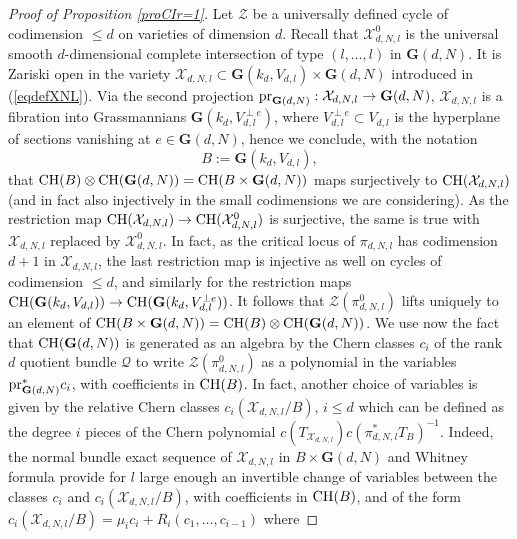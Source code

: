 \documentclass[10pt]{article}
\begin{document}
 \begin{proof}[Proof of Proposition \ref{proCIr=1}] Let $\mathcal{Z}$ be  a universally defined cycle
  of codimension $\leq d$  on varieties of dimension $d$.
Recall that $\mathcal{X}_{d,N,l}^0$ is the universal smooth $d$-dimensional complete intersection of type $(l,\ldots,l)$ in $\mathbf{G}(d,N) $. It is Zariski open in
 the variety $\mathcal{X}_{d,N,l}\subset \mathbf{G}(k_{d}, V_{d,l})\times \mathbf{G}(d,N) $ introduced in (\ref{eqdefXNL}). Via the second projection
 ${\rm pr}_{\mathbf{G}(d,N)}:\mathcal{X}_{d,N,l}\rightarrow \mathbf{G}(d,N)$, $\mathcal{X}_{d,N,l}$ is
 a fibration into Grassmannians $\mathbf{G}(k_{d}, V_{d,l}^{\perp e})$, where
 $V_{d,l}^{\perp e}\subset V_{d,l}$ is the hyperplane of sections vanishing at $e\in \mathbf{G}(d,N) $, hence we conclude, with the notation  $$B:=\mathbf{G}(k_d,V_{d,l}),$$ that
 ${\rm CH}(B)\otimes {\rm CH}(\mathbf{G}(d,N))={\rm CH}(B\times \mathbf{G}(d,N))$
 maps surjectively to ${\rm CH}( \mathcal{X}_{d,N,l})$ (and in fact also injectively in the small codimensions we are considering).
 As the restriction map ${\rm CH}(\mathcal{X}_{d,N,l})
 \rightarrow {\rm CH}(\mathcal{X}_{d,N,l}^0)$ is surjective, the
 same is true with $\mathcal{X}_{d,N,l}$ replaced by $\mathcal{X}_{d,N,l}^0$. In fact, as the critical locus of $\pi_{d,N,l}$ has codimension $d+1$ in $\mathcal{X}_{d,N,l}$,  the last
  restriction map is injective as well on cycles of codimension  $\leq d$, and similarly for the restriction
  maps ${\rm CH}(\mathbf{G}(k_{d}, V_{d,l}))\rightarrow {\rm CH}(\mathbf{G}(k_{d}, V_{d,l}^{\perp e}))$.
It follows that $\mathcal{Z}(\pi_{d,N,l}^0)$ lifts uniquely to an element of
${\rm CH}(B\times \mathbf{G}(d,N))= {\rm CH}(B)\otimes {\rm CH}(\mathbf{G}(d,N))$.
 We use now  the fact that
  ${\rm CH}(\mathbf{G}(d,N))$ is  generated as an algebra by the Chern classes
  $c_i$ of the rank $d$ quotient bundle $\mathcal{Q}$ to write
   $\mathcal{Z}(\pi_{d,N,l}^0)$
 as a polynomial  in the variables ${\rm pr}_{\mathbf{G}(d,N)}^*c_i$, with coefficients in
 ${\rm CH}(B)$.
 In fact, another  choice of variables is given by
 the relative Chern classes $c_i(\mathcal{X}_{d,N,l}/B),\,i\leq d$ which can be defined as
 the degree $i$ pieces of the Chern polynomial $c(T_{\mathcal{X}_{d,N,l}})c(\pi_{d,N,l}^*T_B)^{-1}$.
 Indeed, the normal bundle exact sequence of $\mathcal{X}_{d,N,l}$ in
 $B\times \mathbf{G}(d,N)$ and Whitney formula provide for $l$ large enough an invertible change of variables between
 the classes  $c_i$  and  $c_i(\mathcal{X}_{d,N,l}/B)$, with coefficients in
 ${\rm CH}(B)$, and of the form $c_i(\mathcal{X}_{d,N,l}/B)=\mu_i c_i+R_i(c_1,\ldots,c_{i-1})$ where

\end{proof}
\end{document}
